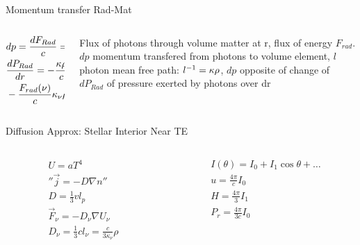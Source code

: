 \begin{frame}{Momentum transfer Rad-Mat}
    \begin{columns}[T]
        \begin{column}{0.6\textwidth}
    \begin{align*}
        &dp=\frac{dF_{Rad}}{c}=\frac{F_{Rad}}{c}\frac{dr}{l}\\
        &\TDy{r}{P_{Rad}}=-\frac{\kappa\rho}{c}F_{Rad}\\
        &-\frac{F_{rad}(\nu)}{c}\kappa_{\nu}\rho\,dr=\frac{4\pi}{3c}\TDy{r}{B_{\nu}(T)}\,dr\tag{L-grad T}
    \end{align*}
        \end{column}
        \begin{column}{0.4\textwidth}
            Flux of photons through volume matter at r, flux of energy $F_{rad}$. $dp$ momentum transfered from photons to volume element, $l$ photon mean free path: $\invers{l}=\kappa\rho$, $dp$ opposite of change of $dP_{Rad}$ of pressure exerted by photons over dr
        \end{column}
    \end{columns}

\end{frame}

\begin{frame}{Diffusion Approx: Stellar Interior Near TE}
    \begin{columns}[T]
        \begin{column}{0.5\textwidth}
    \begin{align*}
                &U=aT^4\\
                &''\vec{j}=-D\nabla n''\tag{diffusion}\\
                &D=\frac{1}{3}vl_p\\
                &\vec{F}_{\nu}=-D_{\nu}\nabla U_{\nu}\\
                &D_{\nu}=\frac{1}{3}cl_{\nu}=\frac{c}{3\kappa_{\nu}}\rho
            \end{align*}
        \end{column}
        \begin{column}{0.5\textwidth}
            \begin{align*}
                &I(\theta)=I_0+I_1\cos{\theta}+\ldots\\
                &u=\frac{4\pi}{c}I_0\\
                &H=\frac{4\pi}{3}I_1\\
                &P_r=\frac{4\pi}{3c}I_0
            \end{align*}
        \end{column}
    \end{columns}
    \end{frame}

